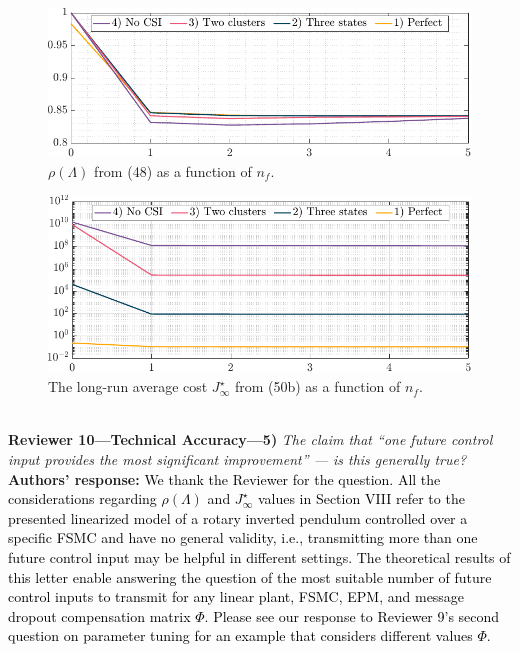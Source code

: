 \begin{figure}[h!]
\begin{center}
\includegraphics[width=0.76\columnwidth]{../stability-cntrl-a.pdf}
\caption{$\rho(\mathit{\Lambda})$ from (48) as a function of $n_f$.}\label{fig:stability}
\end{center}
\end{figure}
\begin{figure}[h!]
\begin{center}
\includegraphics[width=0.76\columnwidth]{../cost-cntrl-a.pdf}
\caption{The long-run average cost $J_{\infty}^{\star}$ from (50b) as a function of $n_f$.}\label{fig:cost}
\end{center}
\end{figure}
\\[4mm]
\textbf{Reviewer 10---Technical Accuracy---5)}\textit{ %
The claim that ``one future control input provides the most significant improvement'' --- is this generally true?}\\[2mm]
\textbf{Authors' response:} \textcolor{black}{We thank the Reviewer for the question. All the considerations regarding $\rho(\mathit{\Lambda})$ and $J_{\infty}^{\star}$ values in Section VIII refer to the presented linearized model of a rotary inverted pendulum controlled over a specific FSMC and have no general validity, i.e., transmitting more than one future control input may be helpful in different settings. The theoretical results of this letter enable answering the question of the most suitable number of future control inputs to transmit for any linear plant, FSMC, EPM, and message dropout compensation matrix $\mathit{\Phi}$. Please see our response to Reviewer 9's second question on parameter tuning for an example that considers different values $\mathit{\Phi}$.
}\\[4mm]
